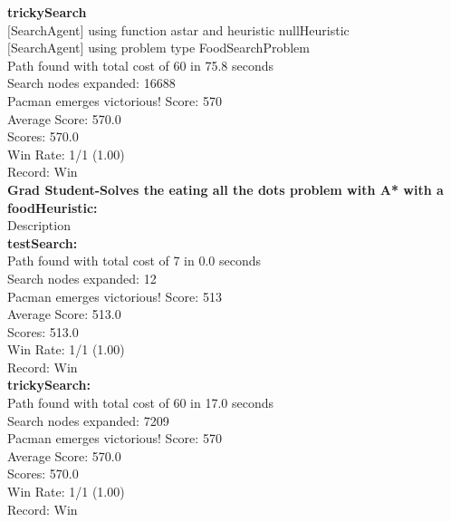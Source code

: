 \documentclass[11pt]{article}
\begin{document}
\noindent
\textbf{trickySearch}\\
$[$SearchAgent$]$ using function astar and heuristic nullHeuristic\\
$[$SearchAgent$]$ using problem type FoodSearchProblem\\
Path found with total cost of 60 in 75.8 seconds\\
Search nodes expanded: 16688\\
Pacman emerges victorious! Score: 570\\
Average Score: 570.0\\
Scores:        570.0\\
Win Rate:      1/1 (1.00)\\
Record:        Win\\

\newpage
\noindent
\textbf{Grad Student-Solves the eating all the dots problem with A* with a foodHeuristic:}\\
Description\\



\noindent
\textbf{testSearch:}\\
Path found with total cost of 7 in 0.0 seconds\\
Search nodes expanded: 12\\
Pacman emerges victorious! Score: 513\\
Average Score: 513.0\\
Scores:        513.0\\
Win Rate:      1/1 (1.00)\\
Record:        Win\\

\noindent
\textbf{trickySearch:}\\
Path found with total cost of 60 in 17.0 seconds\\
Search nodes expanded: 7209\\
Pacman emerges victorious! Score: 570\\
Average Score: 570.0\\
Scores:        570.0\\
Win Rate:      1/1 (1.00)\\
Record:        Win\\
\end{document}
